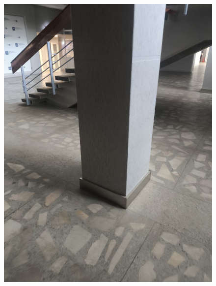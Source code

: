 \begin{figure}[H]
\begin{minipage}[b]{0.3\linewidth}
        \includegraphics[width=\linewidth]{Src/images/photo_5906680020825392808_y.jpg}
        \label{fig:rotation-b}
    \end{minipage}
    \hfill
    \begin{minipage}[b]{0.3\linewidth}
        \centering

\end{minipage}
\end{figure}
